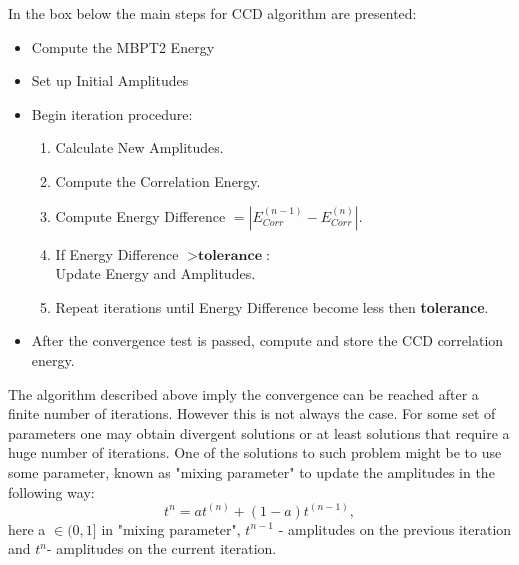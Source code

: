 \documentclass[twoside,english]{uiofysmaster}
\theoremstyle{definition}
\begin{document}
In the box below the main steps for CCD algorithm are presented: 
\begin{tcolorbox}
	\begin{itemize}
		\item Compute the MBPT2 Energy
		\item Set up Initial Amplitudes
		\item Begin iteration procedure:
		\begin{enumerate} 
			\item Calculate New Amplitudes.
			\item Compute the Correlation Energy.
			\item Compute Energy Difference $=|E_{Corr}^{(n-1)} - E_{Corr}^{(n)}|$.
			\item If Energy Difference $ > \textbf{tolerance}$:\\
			 Update Energy and Amplitudes.
			\item Repeat iterations until Energy Difference become less then \textbf{tolerance}.
		\end{enumerate} 
		\item After the convergence test is passed, compute and store the CCD correlation energy.
	\end{itemize}
\end{tcolorbox}
The algorithm described above imply the convergence can be reached after a finite number of iterations. However this is not always the case. For some set of parameters one may obtain divergent solutions or at least solutions that require a huge number of iterations. One of the solutions to such problem might be to use some parameter, known as "mixing parameter" to update the amplitudes in the following way:
\begin{equation}\label{eq:mizampl}
t^{n} = at^(n) + (1-a)t^{(n-1)},
\end{equation}
here a $\in (0,1]$ in "mixing parameter", $t^{n-1}$ - amplitudes on the previous iteration and $t^{n}$- amplitudes on the current iteration.\\
\end{document}
